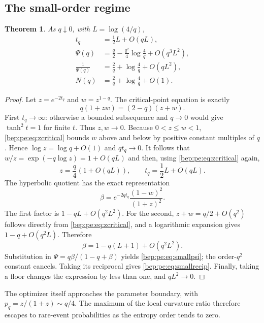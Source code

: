 \documentclass[11pt]{article}
\numberwithin{equation}{section}
\newtheorem{theorem}{Theorem}[section]
\theoremstyle{definition}
\theoremstyle{remark}
\begin{document}
\subsection{The small-order regime}
\begin{theorem}\label{bep:pe:thm:smallq}
As $q\downarrow0$, with $L=\log(4/q)$,
\begin{align}
 t_q&=\frac12L+O(qL),\label{bep:pe:eq:smallt}\\
 \Psi(q)&=\frac q2-\frac{q^2}{4}\log\frac4q+O(q^3L^2),\label{bep:pe:eq:smallpsi}\\
 \frac1{\Psi(q)}&=\frac2q+\log\frac4q+O(qL^2),\label{bep:pe:eq:smallrecip}\\
 N(q)&=\frac2q+\log\frac4q+O(1).
\end{align}
\end{theorem}
\begin{proof}
Let $z=e^{-2t_q}$ and $w=z^{1-q}$. The critical-point equation is
exactly
\begin{equation}
 q(1+zw)=(2-q)(z+w).\label{bep:pe:eq:zcritical}
\end{equation}
First $t_q\to\infty$: otherwise a bounded subsequence and $q\to0$
would give $\tanh^2t=1$ for finite $t$. Thus $z,w\to0$.
Because $0<z\leq w<1$, \eqref{bep:pe:eq:zcritical} bounds $w$ above and below
by positive constant multiples of $q$. Hence
$\log z=\log q+O(1)$ and $qt_q\to0$.
It follows that $w/z=\exp(-q\log z)=1+O(qL)$ and then, using
\eqref{bep:pe:eq:zcritical} again,
\[
 z=\frac q4(1+O(qL)),\qquad t_q=\frac12L+O(qL).
\]
The hyperbolic quotient has the exact representation
\[
 \beta=e^{-2qt_q}\frac{(1-w)^2}{(1+z)^2}.
\]
The first factor is $1-qL+O(q^2L^2)$. For the second,
$z+w=q/2+O(q^2)$ follows directly from \eqref{bep:pe:eq:zcritical}, and a
logarithmic expansion gives $1-q+O(q^2L)$. Therefore
\begin{equation}
 \beta=1-q(L+1)+O(q^2L^2).
\end{equation}
Substitution in $\Psi=q\beta/(1-q+\beta)$ yields
\eqref{bep:pe:eq:smallpsi}; the order-$q^2$ constant cancels. Taking its
reciprocal gives \eqref{bep:pe:eq:smallrecip}. Finally, taking a floor changes
the expression by less than one, and $qL^2\to0$.
\end{proof}
The optimizer itself approaches the parameter boundary, with
$p_q=z/(1+z)\sim q/4$. The maximum of the local curvature ratio therefore
escapes to rare-event probabilities as the entropy order tends to zero.
\end{document}
